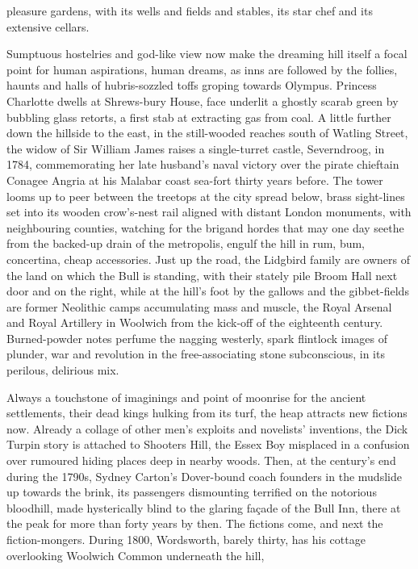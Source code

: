 \documentclass[
]{article}
\begin{document}
pleasure gardens, with its wells and fields and stables, its star chef
and its extensive cellars. \par
Sumptuous hostelries and god-like view now make the dreaming hill
itself a focal point for human aspirations, human dreams, as inns are
followed by the follies, haunts and halls of hubris-sozzled toffs
groping towards Olympus. Princess Charlotte dwells at Shrews-bury House,
face underlit a ghostly scarab green by bubbling glass retorts, a first
stab at extracting gas from coal. A little further down the hillside to
the east, in the still-wooded reaches south of Watling Street, the widow
of Sir William James raises a single-turret castle, Severndroog, in
1784, commemorating her late husband's naval victory over the pirate
chieftain Conagee Angria at his Malabar coast sea-fort thirty years
before. The tower looms up to peer between the treetops at the city
spread below, brass sight-lines set into its wooden crow's-nest rail
aligned with distant London monuments, with neighbouring counties,
watching for the brigand hordes that may one day seethe from the
backed-up drain of the metropolis, engulf the hill in rum, bum,
concertina, cheap accessories. Just up the road, the Lidgbird family are
owners of the land on which the Bull is standing, with their stately
pile Broom Hall next door and on the right, while at the hill's foot by
the gallows and the gibbet-fields are former Neolithic camps
accumulating mass and muscle, the Royal Arsenal and Royal Artillery in
Woolwich from the kick-off of the eighteenth century. Burned-powder
notes perfume the nagging westerly, spark flintlock images of plunder,
war and revolution in the free-associating stone subconscious, in its
perilous, delirious mix. \par
Always a touchstone of imaginings and point of moonrise for the
ancient settlements, their dead kings hulking from its turf, the heap
attracts new fictions now. Already a collage of other men's exploits and
novelists' inventions, the Dick Turpin story is attached to Shooters
Hill, the Essex Boy misplaced in a confusion over rumoured hiding places
deep in nearby woods. Then, at the century's end during the 1790s,
Sydney Carton's Dover-bound coach founders in the mudslide up towards
the brink, its passengers dismounting terrified on the notorious
bloodhill, made hysterically blind to the glaring façade of the Bull
Inn, there at the peak for more than forty years by then. The fictions
come, and next the fiction-mongers. During 1800, Wordsworth, barely
thirty, has his cottage overlooking Woolwich Common underneath the hill,
\end{document}
